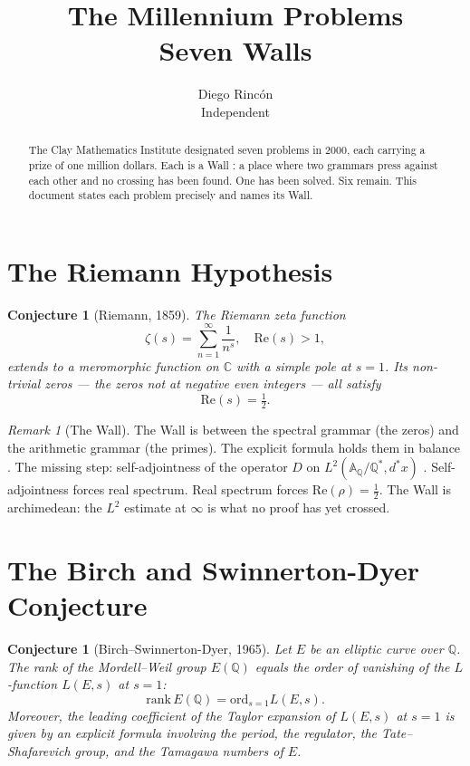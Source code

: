 \documentclass[12pt]{article}
\title{The Millennium Problems\\
\large Seven Walls}
\author{Diego Rinc\'on\\
\small Independent}
\date{}
\newtheorem{conjecture}[theorem]{Conjecture}
\theoremstyle{definition}
\theoremstyle{remark}
\newtheorem{remark}[theorem]{Remark}
\begin{document}
\maketitle

\begin{abstract}
The Clay Mathematics Institute designated seven problems in 2000,
each carrying a prize of one million dollars.
Each is a Wall \cite{synthesis}:
a place where two grammars press against each other
and no crossing has been found.
One has been solved.
Six remain.
This document states each problem precisely
and names its Wall.
\end{abstract}

\section{The Riemann Hypothesis}

\begin{conjecture}[Riemann, 1859]
The Riemann zeta function
\[
\zeta(s) = \sum_{n=1}^\infty \frac{1}{n^s}, \quad \mathrm{Re}(s) > 1,
\]
extends to a meromorphic function on $\mathbb{C}$
with a simple pole at $s=1$.
Its non-trivial zeros --- the zeros not at negative even integers ---
all satisfy
\[
\mathrm{Re}(s) = \tfrac{1}{2}.
\]
\end{conjecture}

\begin{remark}[The Wall]
The Wall is between the spectral grammar (the zeros)
and the arithmetic grammar (the primes).
The explicit formula holds them in balance \cite{week09}.
The missing step: self-adjointness of the operator $D$
on $L^2(\mathbb{A}_\mathbb{Q}/\mathbb{Q}^*, d^*x)$ \cite{week10}.
Self-adjointness forces real spectrum.
Real spectrum forces $\mathrm{Re}(\rho) = \tfrac{1}{2}$.
The Wall is archimedean: the $L^2$ estimate at $\infty$
is what no proof has yet crossed.
\end{remark}

\section{The Birch and Swinnerton-Dyer Conjecture}

\begin{conjecture}[Birch--Swinnerton-Dyer, 1965]
Let $E$ be an elliptic curve over $\mathbb{Q}$.
The rank of the Mordell--Weil group $E(\mathbb{Q})$
equals the order of vanishing of the $L$-function $L(E,s)$ at $s=1$:
\[
\mathrm{rank}\, E(\mathbb{Q}) = \mathrm{ord}_{s=1} L(E,s).
\]
Moreover, the leading coefficient of the Taylor expansion
of $L(E,s)$ at $s=1$ is given by an explicit formula
involving the period, the regulator, the Tate--Shafarevich group,
and the Tamagawa numbers of $E$.
\end{conjecture}
\end{document}
